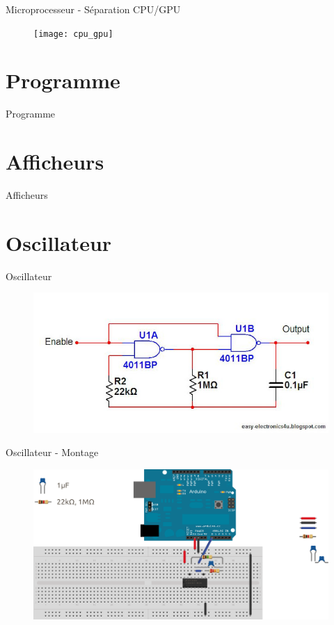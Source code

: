 \documentclass{beamer}
\begin{document}
\begin{frame}{Microprocesseur - Séparation CPU/GPU}
	\begin{figure}
		\centering
		\texttt{[image: cpu\_gpu]}
	\end{figure}
\end{frame}



\section{Programme}
\begin{frame}{Programme}
	
\end{frame}


\section{Afficheurs}
\begin{frame}{Afficheurs}
	
\end{frame}


\section{Oscillateur}
\begin{frame}{Oscillateur}
	\begin{figure}
		\centering
		\includegraphics[width=\textwidth,height=0.9\textheight,keepaspectratio]{oscillator.jpg}
	\end{figure}
\end{frame}

\begin{frame}{Oscillateur - Montage}
	\begin{figure}
		\centering
		\includegraphics[width=\textwidth,height=0.9\textheight,keepaspectratio]{sysdig_clock}
	\end{figure}
\end{frame}
\end{document}
